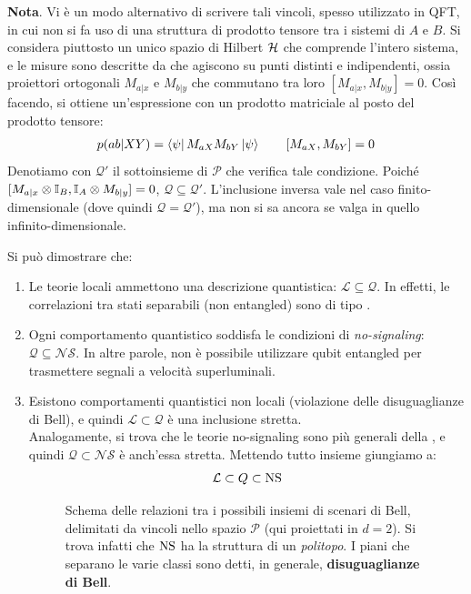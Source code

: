 \documentclass[../../InformazioneQuantistica.tex]{subfiles}
\begin{document}
\begin{enumerate}
\textbf{Nota}. Vi è un modo alternativo di scrivere tali vincoli, spesso utilizzato in QFT, in cui non si fa uso di una struttura di prodotto tensore tra i sistemi di $A$ e $B$. Si considera piuttosto un unico spazio di Hilbert $\mathcal{H}$ che comprende l'intero sistema, e le misure sono descritte da  che agiscono su punti distinti e indipendenti, ossia proiettori ortogonali $M_{a|x}$ e $M_{b|y}$ che commutano tra loro $[M_{a|x}, M_{b|y}]=0$. Così facendo, si ottiene un'espressione con un prodotto matriciale al posto del prodotto tensore:
\begin{align*}
p(ab|XY) = \Bra{\psi}M_{aX} M_{bY} \Ket{\psi} \qquad [M_{aX}, M_{bY}]=0
\end{align*}
Denotiamo con $\mathcal{Q}'$ il sottoinsieme di $\mathcal{P}$ che verifica tale condizione. Poiché $[M_{a|x} \otimes \mathbb{I}_B, \mathbb{I}_A \otimes M_{b|y}]=0$, $\mathcal{Q} \subseteq \mathcal{Q}'$. L'inclusione inversa vale nel caso finito-dimensionale (dove quindi $\mathcal{Q}=\mathcal{Q}'$), ma non si sa ancora se valga in quello infinito-dimensionale.
\end{enumerate}

Si può dimostrare che:
\begin{enumerate}
\item Le teorie locali ammettono una descrizione quantistica: $\mathcal{L} \subseteq \mathcal{Q}$. In effetti, le correlazioni tra stati separabili (non entangled) sono di tipo .
 
\item Ogni comportamento quantistico soddisfa le condizioni di \textit{no-signaling}: $\mathcal{Q} \subseteq \mathcal{NS}$. In altre parole, non è possibile utilizzare qubit entangled per trasmettere segnali a velocità superluminali.
\item Esistono comportamenti quantistici non locali (violazione delle disuguaglianze di Bell), e quindi $\mathcal{L} \subset \mathcal{Q}$ è una inclusione stretta.\\
Analogamente, si trova che le teorie no-signaling 
 sono più generali della \MQ, e quindi $\mathcal{Q} \subset \mathcal{NS}$ è anch'essa stretta. Mettendo tutto insieme giungiamo a:
\begin{align*}
\mathcal{L} \subset Q \subset \operatorname{NS}
\end{align*}

\begin{figure}[H]
\centering

\caption{Schema delle relazioni tra i possibili insiemi di scenari di Bell, delimitati da vincoli nello spazio $\mathcal{P}$ (qui proiettati in $d=2$). Si trova infatti che $\operatorname{NS}$ ha la struttura di un \textit{politopo}. I piani che separano le varie classi sono detti, in generale, \textbf{disuguaglianze di Bell}.\label{fig:classi-scenariBell}}
\end{figure}
\end{enumerate}
\end{document}
